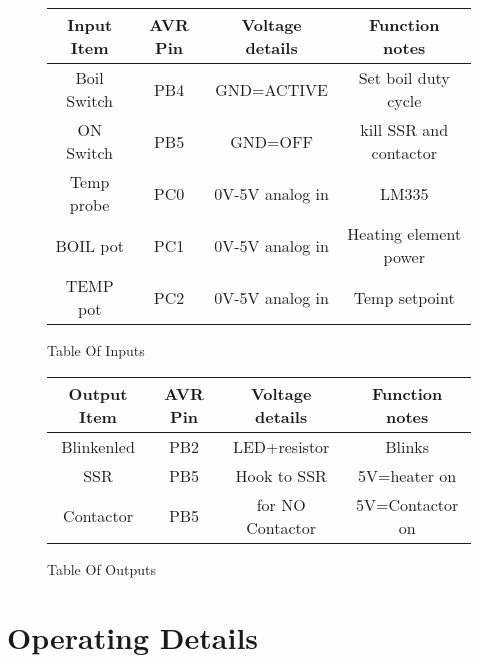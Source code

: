 \documentclass[dvips,12pt]{article}
\begin{document}
\renewcommand{\arraystretch}{1.4}%
\begin{figure}[h]
\centering
\begin{tabular}{|c|c|c|c|}
\hline
Input Item&AVR Pin&Voltage details& Function notes\\
\hline
Boil Switch&PB4&GND=ACTIVE&Set boil duty cycle \\
\hline
ON Switch&PB5&GND=OFF&kill SSR and contactor \\
\hline
Temp probe&PC0&0V-5V analog in&LM335 \\
\hline
BOIL pot&PC1&0V-5V analog in&Heating element power\\
\hline
TEMP pot&PC2&0V-5V analog in&Temp setpoint\\
\hline
\end{tabular}
\caption{Table Of Inputs}
\label{fig:inputs}
\end{figure}

\renewcommand{\arraystretch}{1.4}%
\begin{figure}[h]
\centering
\begin{tabular}{|c|c|c|c|}
\hline
Output Item&AVR Pin&Voltage details& Function notes\\
\hline
Blinkenled&PB2&LED+resistor&Blinks\\
\hline
SSR&PB5&Hook to SSR&5V=heater on\\
\hline
Contactor&PB5&for NO Contactor&5V=Contactor on\\
\hline
\end{tabular}
\caption{Table Of Outputs}
\label{fig:inputs}
\end{figure}

\section{Operating Details}
\end{document}
